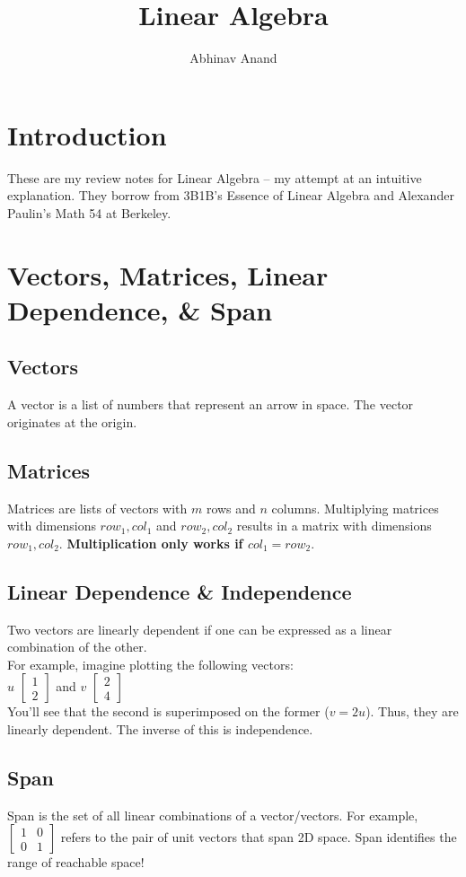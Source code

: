 \documentclass{article}
\title{Linear Algebra}
\author{Abhinav Anand }
\date{}
\begin{document}
\section{Introduction}
These are my review notes for Linear Algebra -- my attempt at an intuitive explanation. They borrow from 3B1B's Essence of Linear Algebra and Alexander Paulin's Math 54 at Berkeley. 

\section{Vectors, Matrices, Linear Dependence, \& Span}

\subsection{Vectors}
A vector is a list of numbers that represent an arrow in space. The vector originates at the origin. 

\subsection{Matrices}
Matrices are lists of vectors with $m$ rows and $n$ columns. Multiplying matrices with dimensions $row_1, col_1$ and $row_2, col_2$ results in a matrix with dimensions $row_1, col_2$. \textbf{Multiplication only works if $col_1 = row_2$}.

\subsection{Linear Dependence \& Independence}
Two vectors are linearly dependent if one can be expressed as a linear combination of the other. \\ For example, imagine plotting the following vectors: \\
$u$ $\begin{bmatrix}
    1 \\
    2
\end{bmatrix}$ and $v$ $\begin{bmatrix}
    2 \\
    4
\end{bmatrix}$
\\
You'll see that the second is superimposed on the former ($v = 2u$). Thus, they are linearly dependent. The inverse of this is independence. 

\subsection{Span}
Span is the set of all linear combinations of a vector/vectors. For example, \\ 
$\begin{bmatrix}
    1 & 0 \\
    0 & 1
\end{bmatrix}$ refers to the pair of unit vectors that span 2D space. Span identifies the range of reachable space!
\end{document}

